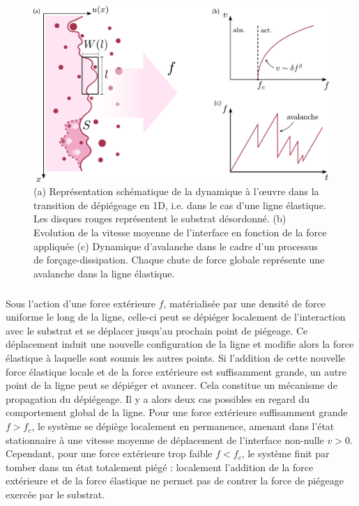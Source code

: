 \begin{figure}[h]
	\centering
	\includegraphics[width=\textwidth]{Chapitre1/Figures/Depinning/depinningbase.pdf}
	\caption{(a) Représentation schématique de la dynamique à l’œuvre dans la transition de dépiégeage en 1D, i.e. dans le cas d'une ligne élastique. Les disques rouges représentent le substrat désordonné. (b) Evolution de la vitesse moyenne de l'interface en fonction de la force appliquée (c) Dynamique d'avalanche dans le cadre d'un processus de forçage-dissipation. Chaque chute de force globale représente une avalanche dans la ligne élastique.}
	\label{fig:depinningbase}
\end{figure} 

\subparagraph{}Sous l'action d'une force extérieure $f$, matérialisée par une densité de force uniforme le long de la ligne,  celle-ci peut se dépiéger localement de l'interaction avec le substrat et se déplacer jusqu'au prochain point de piégeage. Ce déplacement induit une nouvelle configuration de la ligne et modifie alors la force élastique à laquelle sont soumis les autres points. Si l'addition de cette nouvelle force élastique locale et de la force extérieure est suffisamment grande, un autre point de la ligne peut se dépiéger et avancer. Cela constitue un mécanisme de propagation du dépiégeage. Il y a alors deux cas possibles en regard du comportement global de la ligne. Pour une force extérieure suffisamment grande $f>f_c$, le système se dépiège localement en permanence, amenant dans l'état stationnaire à une vitesse moyenne de déplacement de l'interface non-nulle $v>0$. Cependant, pour une force extérieure trop faible $f<f_c$, le système finit par tomber dans un état totalement piégé : localement l'addition de la force extérieure et de la force élastique ne permet pas de contrer la force de piégeage exercée par le substrat. 

